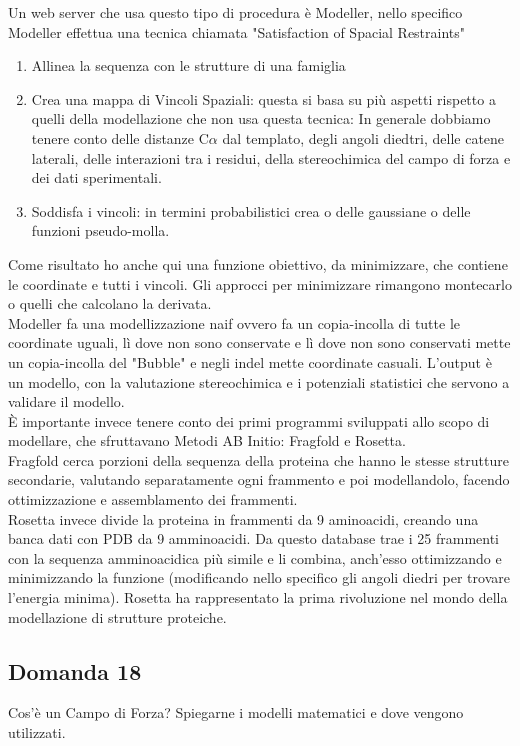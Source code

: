 \documentclass{article}
\begin{document}
Un web server che usa questo tipo di procedura è Modeller, nello specifico Modeller effettua una tecnica chiamata "Satisfaction of Spacial Restraints" 
\begin{enumerate}
    \item Allinea la sequenza con le strutture di una famiglia
    \item Crea una mappa di Vincoli Spaziali: questa si basa su più aspetti rispetto a quelli della modellazione che non usa questa tecnica: In generale dobbiamo tenere conto delle distanze C$\alpha$ dal templato, degli angoli diedtri, delle catene laterali, delle interazioni tra i residui, della stereochimica del campo di forza e dei dati sperimentali.
    \item Soddisfa i vincoli: in termini probabilistici crea o delle gaussiane o delle funzioni pseudo-molla.
\end{enumerate}
Come risultato ho anche qui una funzione obiettivo, da minimizzare, che contiene le coordinate e tutti i vincoli. Gli approcci per minimizzare rimangono montecarlo o quelli che calcolano la derivata.\\
Modeller fa una modellizzazione naif ovvero fa un copia-incolla di tutte le coordinate uguali, lì dove non sono conservate e lì dove non sono conservati mette un copia-incolla del "Bubble" e negli indel mette coordinate casuali. 
L'output è un modello, con la valutazione stereochimica e i potenziali statistici che servono a validare il modello.\\
È importante invece tenere conto dei primi programmi sviluppati allo scopo di modellare, che sfruttavano Metodi AB Initio: Fragfold e Rosetta.\\
Fragfold cerca porzioni della sequenza della proteina che hanno le stesse strutture secondarie, valutando separatamente ogni frammento e poi modellandolo, facendo ottimizzazione e assemblamento dei frammenti.\\
Rosetta invece divide la proteina in frammenti da 9 aminoacidi, creando una banca dati con PDB da 9 amminoacidi. Da questo database trae i 25 frammenti con la sequenza amminoacidica più simile e li combina, anch'esso ottimizzando e minimizzando la funzione (modificando nello specifico gli angoli diedri
per trovare l'energia minima). Rosetta ha rappresentato la prima rivoluzione nel mondo della modellazione di strutture proteiche. 

\subsection*{Domanda 18}
Cos'è un Campo di Forza? Spiegarne i modelli matematici e dove vengono utilizzati.
\end{document}
